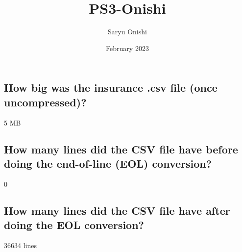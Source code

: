 \documentclass{article}
\title{PS3-Onishi}
\author{Saryu Onishi}
\date{February 2023}
\begin{document}
\maketitle
\subsection{How big was the insurance .csv file (once uncompressed)?}
5 MB
\subsection{How many lines did the CSV file have before doing the end-of-line (EOL) conversion?}
0
\subsection{How many lines did the CSV file have after doing the EOL conversion?}
36634 lines
\end{document}
